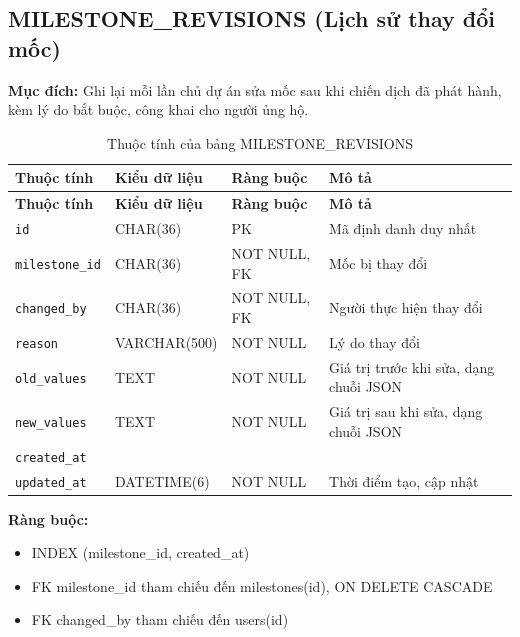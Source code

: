 \subsection{MILESTONE\_\allowbreak{}REVISIONS (Lịch sử thay đổi mốc)}

\textbf{Mục đích:} Ghi lại mỗi lần chủ dự án sửa mốc sau khi chiến dịch đã phát hành, kèm lý do bắt buộc, công khai cho người ủng hộ.

{\small
\begin{longtable}{|P{3.2cm}|P{2.8cm}|P{2.2cm}|p{5.4cm}|}
    \caption{Thuộc tính của bảng MILESTONE\_\allowbreak{}REVISIONS}
    \label{tab:milestone_revisions} \\
    \hline
    \textbf{Thuộc tính} & \textbf{Kiểu dữ liệu} & \textbf{Ràng buộc} & \textbf{Mô tả} \\
    \hline
    \endfirsthead
    \hline
    \textbf{Thuộc tính} & \textbf{Kiểu dữ liệu} & \textbf{Ràng buộc} & \textbf{Mô tả} \\
    \hline
    \endhead

    \texttt{id} & CHAR(36) & PK & Mã định danh duy nhất \\
    \hline
    \texttt{milestone\_\allowbreak{}id} & CHAR(36) & NOT NULL, FK & Mốc bị thay đổi \\
    \hline
    \texttt{changed\_\allowbreak{}by} & CHAR(36) & NOT NULL, FK & Người thực hiện thay đổi \\
    \hline
    \texttt{reason} & VARCHAR(500) & NOT NULL & Lý do thay đổi \\
    \hline
    \texttt{old\_\allowbreak{}values} & TEXT & NOT NULL & Giá trị trước khi sửa, dạng chuỗi JSON \\
    \hline
    \texttt{new\_\allowbreak{}values} & TEXT & NOT NULL & Giá trị sau khi sửa, dạng chuỗi JSON \\
    \hline
    \texttt{created\_\allowbreak{}at} &  &  &  \\
    \hline
    \texttt{updated\_\allowbreak{}at} & DATETIME(6) & NOT NULL & Thời điểm tạo, cập nhật \\
    \hline
\end{longtable}
}

\textbf{Ràng buộc:}
\begin{itemize}
    \item INDEX (milestone\_\allowbreak{}id, created\_\allowbreak{}at)
    \item FK milestone\_\allowbreak{}id tham chiếu đến milestones(id), ON DELETE CASCADE
    \item FK changed\_\allowbreak{}by tham chiếu đến users(id)
\end{itemize}

